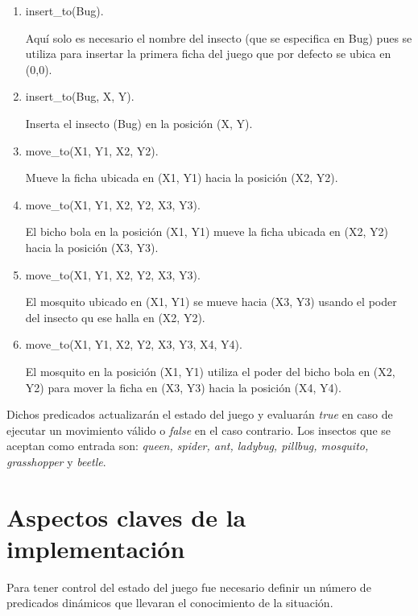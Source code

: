 \documentclass[runningheads,a4paper]{llncs}
\begin{document}
\begin{enumerate}
	\item insert\_to(Bug). 
	
	Aqu\'i solo es necesario el nombre del insecto (que se especifica en Bug) pues se utiliza para insertar la primera ficha del juego que por defecto se ubica en (0,0).\\
	
	\item insert\_to(Bug, X, Y). 
	
	Inserta el insecto (Bug) en la posici\'on (X, Y).\\
	
	\item move\_to(X1, Y1, X2, Y2).
	
	 Mueve la ficha ubicada en (X1, Y1) hacia la posici\'on (X2, Y2).\\
	
	\item move\_to(X1, Y1, X2, Y2, X3, Y3). 
	
	El bicho bola en la posici\'on (X1, Y1) mueve la ficha ubicada en (X2, Y2) hacia la posici\'on (X3, Y3).\\
	
	\item move\_to(X1, Y1, X2, Y2, X3, Y3). 
	
	El mosquito ubicado en (X1, Y1) se mueve hacia (X3, Y3) usando el poder del insecto qu ese halla en (X2, Y2).\\
	
	\item move\_to(X1, Y1, X2, Y2, X3, Y3, X4, Y4). 
	
	El mosquito en la posici\'on  (X1, Y1) utiliza el poder del bicho bola en (X2, Y2) para mover la ficha en (X3, Y3) hacia la posici\'on (X4, Y4).\\
\end{enumerate}

Dichos predicados actualizar\'an el estado del juego y evaluar\'an \emph{true} en caso de ejecutar un movimiento v\'alido o \emph{false} en el caso contrario. Los insectos que se aceptan como entrada son: \emph{queen, spider, ant, ladybug, pillbug, mosquito, grasshopper} y \emph{beetle}.


\section{Aspectos claves de la implementaci\'on}
Para tener control del estado del juego fue necesario definir un n\'umero de predicados din\'amicos que llevaran el conocimiento de la situaci\'on. 
\end{document}
